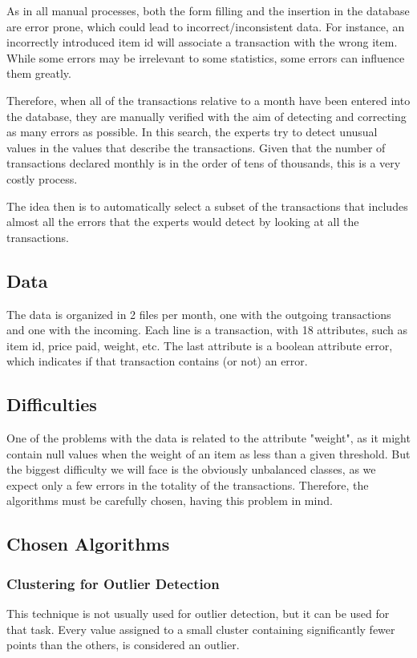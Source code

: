 \documentclass{llncs}
\begin{document}
As in all manual processes, both the form filling and the insertion in the database are error prone, which could lead to incorrect/inconsistent data. For instance, an incorrectly introduced item id will associate a transaction with the wrong item. While some errors may be irrelevant to some statistics, some errors can influence them greatly.

Therefore, when all of the transactions relative to a month have been entered into the database, they are manually verified with the aim of detecting and correcting as many errors as possible. In this search, the experts try to detect unusual values in the values that describe the transactions.
Given that the number of transactions declared monthly is in the order of tens of thousands, this is a very costly process.

The idea then is to automatically select a subset of the transactions that includes almost all the errors that the experts would detect by looking at all the transactions.

\subsection{Data}

The data is organized in 2 files per month, one with the outgoing transactions and one with the incoming. Each line is a transaction, with 18 attributes, such as item id, price paid, weight, etc. The last attribute is a boolean attribute error, which indicates if that transaction contains (or not) an error.

\subsection{Difficulties}
\label{sec:difficulties}

One of the problems with the data is related to the attribute "weight", as it might contain null values when the weight of an item as less than a given threshold. But the biggest difficulty we will face is
the obviously unbalanced classes, as we expect only a few errors in the totality of the transactions. Therefore, the algorithms must be carefully chosen, having this problem in mind.

\subsection{Chosen Algorithms}

\subsubsection{Clustering for Outlier Detection}
This technique is not usually used for outlier detection, but it can be used for that task.
Every value assigned to a small cluster containing significantly fewer points than the others, is considered an outlier.
\end{document}
